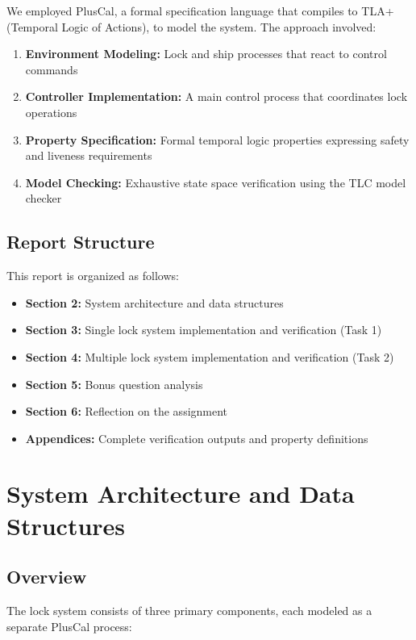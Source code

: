 \documentclass[12pt,a4paper]{article}
\begin{document}
We employed PlusCal, a formal specification language that compiles to TLA+ (Temporal Logic of Actions), to model the system. The approach involved:

\begin{enumerate}
    \item \textbf{Environment Modeling:} Lock and ship processes that react to control commands
    \item \textbf{Controller Implementation:} A main control process that coordinates lock operations
    \item \textbf{Property Specification:} Formal temporal logic properties expressing safety and liveness requirements
    \item \textbf{Model Checking:} Exhaustive state space verification using the TLC model checker
\end{enumerate}

\subsection{Report Structure}

This report is organized as follows:

\begin{itemize}
    \item \textbf{Section 2:} System architecture and data structures
    \item \textbf{Section 3:} Single lock system implementation and verification (Task 1)
    \item \textbf{Section 4:} Multiple lock system implementation and verification (Task 2)
    \item \textbf{Section 5:} Bonus question analysis
    \item \textbf{Section 6:} Reflection on the assignment
    \item \textbf{Appendices:} Complete verification outputs and property definitions
\end{itemize}

\newpage
\section{System Architecture and Data Structures}

\subsection{Overview}

The lock system consists of three primary components, each modeled as a separate PlusCal process:
\end{document}
